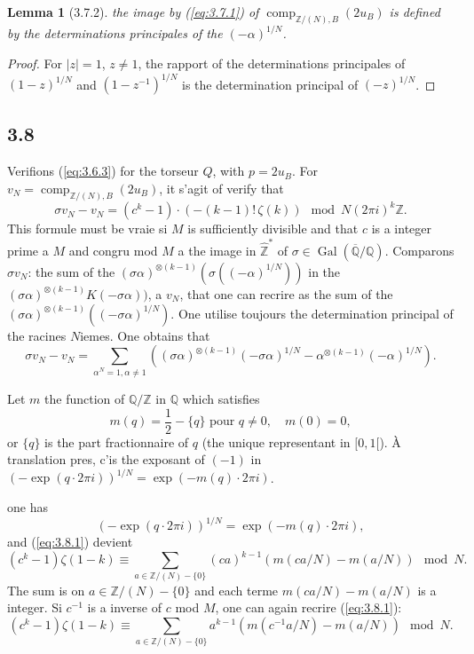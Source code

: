 \documentclass[12pt,a4paper]{article}
\theoremstyle{plain}
\newtheorem{lemma}[theorem]{Lemma}
\theoremstyle{definition}
\theoremstyle{remark}
\DeclareMathOperator{\Gal}{Gal}
\providecommand{\Gal}{\operatorname{Gal}}
\providecommand{\comp}{\operatorname{comp}}
\begin{document}
\begin{lemma}[3.7.2]\label{lem:3.7.2}
the image by (\ref{eq:3.7.1}) of $\comp_{\mathbb{Z}/(N),B}(2u_B)$ is defined by the
determinations principales of the $(-\alpha)^{1/N}$.
\end{lemma}
\begin{proof}
For $|z| = 1$, $z \neq 1$, the rapport of the determinations principales of
$(1-z)^{1/N}$ and $(1-z^{-1})^{1/N}$ is the determination principal of $(-z)^{1/N}$.
\end{proof}

\subsection*{3.8}

Verifions (\ref{eq:3.6.3}) for the torseur $Q$, with $p = 2u_B$. For $v_N =
\comp_{\mathbb{Z}/(N),B}(2u_B)$, it s'agit of verify that
\begin{equation}\label{eq:3.8.1}
\sigma v_N - v_N = (c^k-1) \cdot (-(k-1)!\,\zeta(k)) \mod N(2\pi i)^k \mathbb{Z}.
\end{equation}
This formule must be vraie si $M$ is sufficiently divisible and that $c$ is a integer
prime a $M$ and congru mod $M$ a the image in $\hat{\mathbb{Z}}^*$ of $\sigma \in
\Gal(\overline{\mathbb{Q}}/\mathbb{Q})$. Comparons $\sigma v_N$: the sum of the
$(\sigma\alpha)^{\otimes(k-1)}(\sigma((-\alpha)^{1/N}))$ in the
$(\sigma\alpha)^{\otimes(k-1)} K(-\sigma\alpha))$, a $v_N$, that one can recrire as
the sum of the $(\sigma\alpha)^{\otimes(k-1)}((-\sigma\alpha)^{1/N})$. One utilise toujours the
determination principal of the racines $N$iemes. One obtains that
\[
\sigma v_N - v_N = \sum_{\alpha^N=1, \alpha \neq 1} ((\sigma\alpha)^{\otimes(k-1)}
(-\sigma\alpha)^{1/N} - \alpha^{\otimes(k-1)}(-\alpha)^{1/N}).
\]

Let $m$ the function of $\mathbb{Q}/\mathbb{Z}$ in $\mathbb{Q}$ which satisfies
\begin{equation}\label{eq:3.8.2}
m(q) = \frac{1}{2} - \{q\} \text{ pour } q \neq 0, \quad m(0) = 0,
\end{equation}
or $\{q\}$ is the part fractionnaire of $q$ (the unique representant in $[0,1[$).
\`A translation pres, c'is the exposant of $(-1)$ in
$(-\exp(q \cdot 2\pi i))^{1/N} = \exp(-m(q) \cdot 2\pi i)$.

one has
\[
(-\exp(q \cdot 2\pi i))^{1/N} = \exp(-m(q) \cdot 2\pi i),
\]
and (\ref{eq:3.8.1}) devient
\[
(c^k-1) \zeta(1-k) \equiv \sum_{a \in \mathbb{Z}/(N)-\{0\}} (ca)^{k-1}
(m(ca/N) - m(a/N)) \mod N.
\]
The sum is on $a \in \mathbb{Z}/(N) - \{0\}$ and each terme $m(ca/N) - m(a/N)$ is
a integer. Si $c^{-1}$ is a inverse of $c$ mod $M$, one can again recrire
(\ref{eq:3.8.1}):
\begin{equation}\label{eq:3.8.3}
(c^k-1)\zeta(1-k) \equiv \sum_{a \in \mathbb{Z}/(N)-\{0\}} a^{k-1}
(m(c^{-1}a/N) - m(a/N)) \mod N.
\end{equation}
\end{document}
